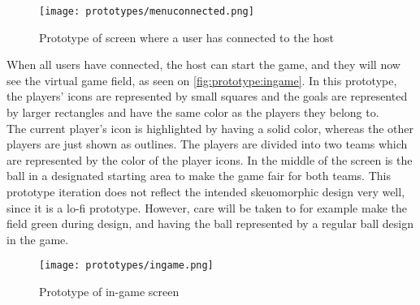 \begin{figure}[H]
    \centering
    \texttt{[image: prototypes/menuconnected.png]}
    \caption{Prototype of screen where a user has connected to the host}
    \label{fig:prototype:menuconnected}
\end{figure}

\noindent
When all users have connected, the host can start the game, and they will now see the virtual game field, as seen on \autoref{fig:prototype:ingame}.
In this prototype, the players' icons are represented by small squares and the goals are represented by larger rectangles and have the same color as the players they belong to. \\
The current player's icon is highlighted by having a solid color, whereas the other players are just shown as outlines. 
The players are divided into two teams which are represented by the color of the player icons.
In the middle of the screen is the ball in a designated starting area to make the game fair for both teams.
This prototype iteration does not reflect the intended skeuomorphic design very well, since it is a lo-fi prototype.
However, care will be taken to for example make the field green during design, and having the ball represented by a regular ball design in the game.
\begin{figure}[H]
    \centering
    \texttt{[image: prototypes/ingame.png]}
    \caption{Prototype of in-game screen}
    \label{fig:prototype:ingame}
\end{figure}
